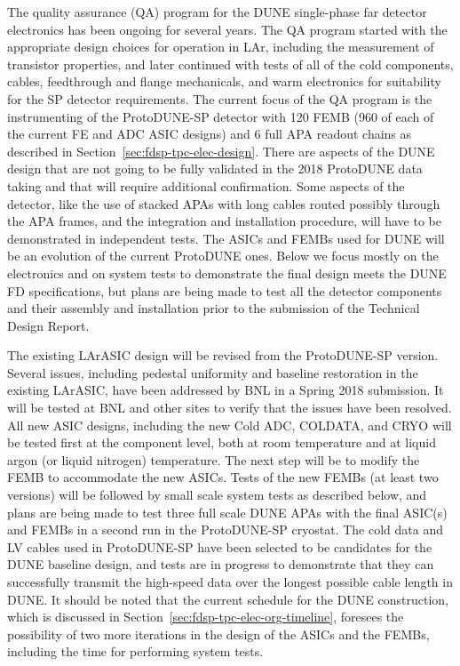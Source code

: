 The quality assurance (QA) program for the DUNE single-phase far detector electronics has been ongoing for several years.  The QA program started with the appropriate design choices for operation
in LAr, including the measurement of transistor properties, and later
continued with tests of all of the cold components, cables, feedthrough and flange mechanicals, and warm electronics for suitability for the SP detector requirements.  The current focus of the QA program is the instrumenting of the ProtoDUNE-SP detector with 120 FEMB (960 of each of the current FE and ADC ASIC designs) and 6 full APA readout chains as described in Section~\ref{sec:fdsp-tpc-elec-design}. There are aspects of the DUNE design that are not going to be fully validated in the 2018 ProtoDUNE data taking and that will require additional confirmation. Some aspects of the detector, like the use of stacked APAs with long cables routed possibly through the APA frames, and the integration and installation procedure, will have to be demonstrated in independent tests. The ASICs and FEMBs used for DUNE will be an evolution of the current ProtoDUNE ones. Below we focus mostly on the electronics and on system tests to demonstrate the final design meets the DUNE FD specifications, but plans are being made to test all the detector components and their assembly and installation prior to the submission of the Technical Design Report.

The existing LArASIC design will be revised from the ProtoDUNE-SP version. Several issues, 
including pedestal uniformity and baseline restoration in the existing LArASIC, have been 
addressed by BNL in a Spring 2018 submission. It will be tested at BNL and other sites to 
verify that the issues have been resolved. All new ASIC designs, including the new Cold ADC, COLDATA, and CRYO will be tested first at the component level, both at room temperature and at liquid argon (or liquid nitrogen) temperature. The next step will be to modify the FEMB to accommodate the new ASICs.  Tests of the new FEMBs (at least two versions) will be followed by small scale system tests as described below, and plans are being made to test three full scale DUNE APAs with the final ASIC(s) and FEMBs in a second run in the ProtoDUNE-SP cryostat.  The cold data and LV cables used in ProtoDUNE-SP have been selected to be candidates for the DUNE baseline design, and tests are in progress to demonstrate that they can successfully transmit the high-speed data over the longest possible cable length in DUNE. It should be noted that the current schedule for the DUNE construction, which is discussed in Section~\ref{sec:fdsp-tpc-elec-org-timeline}, foresees the possibility of two more iterations in the design of the ASICs and the FEMBs, including the time for performing system tests.

